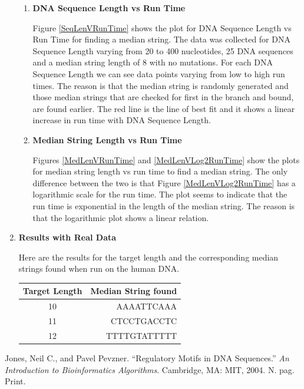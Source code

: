 \documentclass[paper=a4, fontsize=11pt]{scrartcl} %
\numberwithin{equation}{section} %
\numberwithin{figure}{section} %
\numberwithin{table}{section} %
\begin{document}
\begin{enumerate}
\begin{enumerate}
\item \textbf{DNA Sequence Length vs Run Time}

Figure \ref{SeqLenVRunTime} shows the plot for DNA Sequence Length vs Run Time for finding a median string. The data was collected for DNA Sequence Length varying from 20 to 400 nucleotides, 25 DNA sequences and a median string length of 8 with no mutations. For each DNA Sequence Length we can see data points varying from low to high run times. The reason is that the median string is randomly generated and those median strings that are checked for first in the branch and bound, are found earlier. The red line is the line of best fit and it shows a linear increase in run time with DNA Sequence Length. 

\item \textbf{Median String Length vs Run Time}

Figures \ref{MedLenVRunTime} and \ref{MedLenVLog2RunTime} show the plots for median string length vs run time to find a median string. The only difference between the two is that Figure \ref{MedLenVLog2RunTime} has a logarithmic scale for the run time. The plot seems to indicate that the run time is exponential in the length of the median string. The reason is that the logarithmic plot shows a linear relation. 

\end{enumerate}

\item \textbf{Results with Real Data}

Here are the results for the target length and the corresponding median strings found when run on the human DNA.\\

\begin{tabular}{ | c | r |}
  \hline			
  Target Length & Median String found  \\
  \hline			
  10 & AAAATTCAAA  \\
  \hline			
  11 & CTCCTGACCTC  \\
  \hline			
  12 & TTTTGTATTTTT  \\
  \hline  
\end{tabular}

\end{enumerate}

\clearpage
\begin{thebibliography}{9}

Jones, Neil C., and Pavel Pevzner. \enquote{Regulatory Motifs in DNA Sequences.} \textit{An Introduction to Bioinformatics Algorithms}. Cambridge, MA: MIT, 2004. N. pag. Print.

\end{thebibliography}
\end{document}
